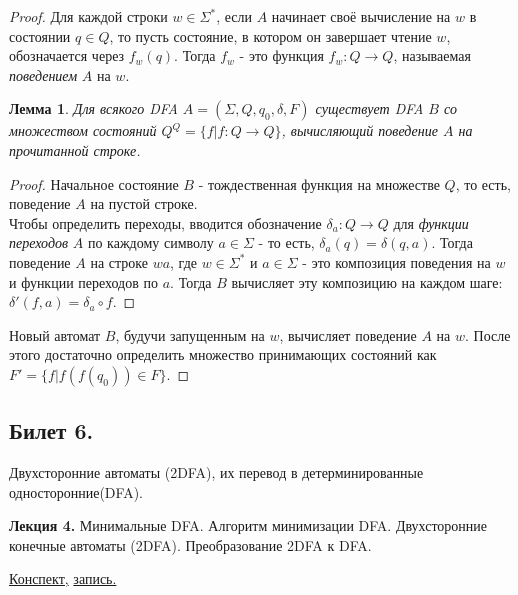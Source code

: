 \documentclass[a4paper]{article}
\newcommand{\mybox}{%
    \collectbox{%
        \setlength{\fboxsep}{1pt}%
        \fbox{\BOXCONTENT}%
    }%
}
\theoremstyle{indented}
\newtheorem{lemma}{Лемма}
\theoremstyle{definition}
\theoremstyle{remark}
\DeclareMathOperator{\ra}{\rightarrow}
\begin{document}
\begin{proof}

    Для каждой строки $w \in \Sigma^*$, если $A$ начинает своё вычисление на $w$ в состоянии $q \in Q$, то пусть состояние, в котором он завершает чтение $w$, обозначается через $f_w(q)$. Тогда $f_w$ - это функция $f_w : Q \ra Q$, называемая \textit{поведением} $A$ на $w$. \\

    \begin{lemma}
        Для всякого DFA $A = (\Sigma, Q, q_0, \delta, F )$ существует DFA $B$ со множеством состояний $Q^Q = \{ f | f : Q \ra Q \}$, вычисляющий поведение $A$ на прочитанной строке.
    \end{lemma}

    \begin{proof} 
        Начальное состояние $B$ - тождественная функция на множестве $Q$, то есть, поведение $A$ на пустой строке. \\ 

        Чтобы определить переходы, вводится обозначение $\delta_a : Q \ra Q$ для \textit{функции переходов} $A$ по каждому символу $a \in \Sigma$ - то есть, $\delta_a(q) = \delta(q,a)$. Тогда поведение $A$ на строке $wa$, где $w \in \Sigma^*$ и $a \in \Sigma$ - это композиция поведения на $w$ и функции переходов по $a$. Тогда $B$ вычисляет эту композицию на каждом шаге: $\delta'(f, a) = \delta_a \circ f$.
    \end{proof}

    Новый автомат $B$, будучи запущенным на $w$, вычисляет поведение $A$ на $w$. После этого достаточно определить множество принимающих состояний как $F' = \{f | f(f(q_0)) \in F \}$.

\end{proof}



\newpage 

\subsection{Билет 6.}

Двухсторонние автоматы (2DFA), их перевод в детерминированные односторонние(DFA).

\hrulefill

\textbf{Лекция 4.} Минимальные DFA. Алгоритм минимизации DFA. Двухсторонние конечные автоматы (2DFA). Преобразование 2DFA к DFA.

\begin{flushright}
    \mybox{
        \href{https://users.math-cs.spbu.ru/~okhotin/teaching/tcs_fl_2021/okhotin_tcs_fl_2021_l4.pdf}{Конспект,}
        \href{https://disk.yandex.ru/d/knoQ44wLmGDwwQ/2021-2022%20учебный%20год%20(осенний%20семестр)/2%20курс/Теоретическая%20информатика/Теор%20информатика%2C%20лекция%2C%2022.09.2021%20.mp4}{запись.}
    }
\end{flushright}
\end{document}
